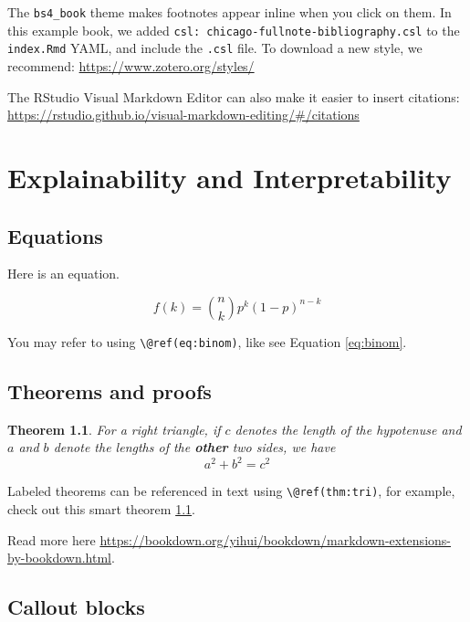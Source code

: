 \documentclass[
]{book}
\newtheorem{theorem}{Theorem}[chapter]
\theoremstyle{definition}
\theoremstyle{definition}
\theoremstyle{definition}
\theoremstyle{definition}
\theoremstyle{remark}
\begin{document}
The \texttt{bs4\_book} theme makes footnotes appear inline when you click on them. In this example book, we added \texttt{csl:\ chicago-fullnote-bibliography.csl} to the \texttt{index.Rmd} YAML, and include the \texttt{.csl} file. To download a new style, we recommend: \url{https://www.zotero.org/styles/}

The RStudio Visual Markdown Editor can also make it easier to insert citations: \url{https://rstudio.github.io/visual-markdown-editing/\#/citations}

\hypertarget{ch-explainability}{%
\chapter{Explainability and Interpretability}\label{ch-explainability}}

\hypertarget{equations}{%
\section{Equations}\label{equations}}

Here is an equation.

\begin{equation} 
  f\left(k\right) = \binom{n}{k} p^k\left(1-p\right)^{n-k}
  \label{eq:binom}
\end{equation}

You may refer to using \texttt{\textbackslash{}@ref(eq:binom)}, like see Equation \eqref{eq:binom}.

\hypertarget{theorems-and-proofs}{%
\section{Theorems and proofs}\label{theorems-and-proofs}}

\begin{theorem}
\protect\hypertarget{thm:tri}{}\label{thm:tri}For a right triangle, if \(c\) denotes the \emph{length} of the hypotenuse
and \(a\) and \(b\) denote the lengths of the \textbf{other} two sides, we have
\[a^2 + b^2 = c^2\]
\end{theorem}

Labeled theorems can be referenced in text using \texttt{\textbackslash{}@ref(thm:tri)}, for example, check out this smart theorem \ref{thm:tri}.

Read more here \url{https://bookdown.org/yihui/bookdown/markdown-extensions-by-bookdown.html}.

\hypertarget{callout-blocks}{%
\section{Callout blocks}\label{callout-blocks}}
\end{document}
